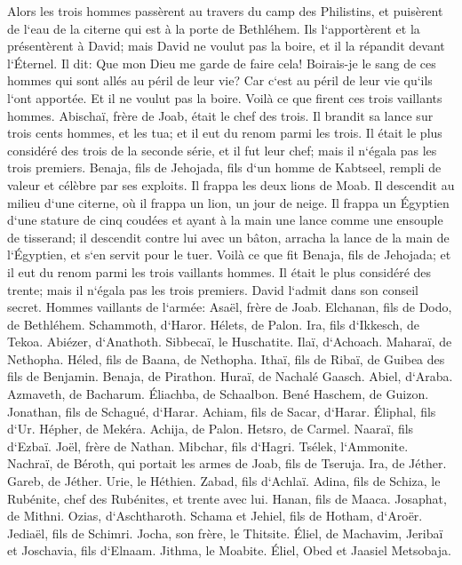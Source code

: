 \verse Alors les trois hommes passèrent au travers du camp des Philistins, et puisèrent de l`eau de la citerne qui est à la porte de Bethléhem. Ils l`apportèrent et la présentèrent à David; mais David ne voulut pas la boire, et il la répandit devant l`Éternel. 
\verse Il dit: Que mon Dieu me garde de faire cela! Boirais-je le sang de ces hommes qui sont allés au péril de leur vie? Car c`est au péril de leur vie qu`ils l`ont apportée. Et il ne voulut pas la boire. Voilà ce que firent ces trois vaillants hommes. 
\verse Abischaï, frère de Joab, était le chef des trois. Il brandit sa lance sur trois cents hommes, et les tua; et il eut du renom parmi les trois. 
\verse Il était le plus considéré des trois de la seconde série, et il fut leur chef; mais il n`égala pas les trois premiers. 
\verse Benaja, fils de Jehojada, fils d`un homme de Kabtseel, rempli de valeur et célèbre par ses exploits. Il frappa les deux lions de Moab. Il descendit au milieu d`une citerne, où il frappa un lion, un jour de neige. 
\verse Il frappa un Égyptien d`une stature de cinq coudées et ayant à la main une lance comme une ensouple de tisserand; il descendit contre lui avec un bâton, arracha la lance de la main de l`Égyptien, et s`en servit pour le tuer. 
\verse Voilà ce que fit Benaja, fils de Jehojada; et il eut du renom parmi les trois vaillants hommes. 
\verse Il était le plus considéré des trente; mais il n`égala pas les trois premiers. David l`admit dans son conseil secret. 
\verse Hommes vaillants de l`armée: Asaël, frère de Joab. Elchanan, fils de Dodo, de Bethléhem. 
\verse Schammoth, d`Haror. Hélets, de Palon. 
\verse Ira, fils d`Ikkesch, de Tekoa. Abiézer, d`Anathoth. 
\verse Sibbecaï, le Huschatite. Ilaï, d`Achoach. 
\verse Maharaï, de Nethopha. Héled, fils de Baana, de Nethopha. 
\verse Ithaï, fils de Ribaï, de Guibea des fils de Benjamin. Benaja, de Pirathon. 
\verse Huraï, de Nachalé Gaasch. Abiel, d`Araba. 
\verse Azmaveth, de Bacharum. Éliachba, de Schaalbon. 
\verse Bené Haschem, de Guizon. Jonathan, fils de Schagué, d`Harar. 
\verse Achiam, fils de Sacar, d`Harar. Éliphal, fils d`Ur. 
\verse Hépher, de Mekéra. Achija, de Palon. 
\verse Hetsro, de Carmel. Naaraï, fils d`Ezbaï. 
\verse Joël, frère de Nathan. Mibchar, fils d`Hagri. 
\verse Tsélek, l`Ammonite. Nachraï, de Béroth, qui portait les armes de Joab, fils de Tseruja. 
\verse Ira, de Jéther. Gareb, de Jéther. 
\verse Urie, le Héthien. Zabad, fils d`Achlaï. 
\verse Adina, fils de Schiza, le Rubénite, chef des Rubénites, et trente avec lui. 
\verse Hanan, fils de Maaca. Josaphat, de Mithni. 
\verse Ozias, d`Aschtharoth. Schama et Jehiel, fils de Hotham, d`Aroër. 
\verse Jediaël, fils de Schimri. Jocha, son frère, le Thitsite. 
\verse Éliel, de Machavim, Jeribaï et Joschavia, fils d`Elnaam. Jithma, le Moabite. 
\verse Éliel, Obed et Jaasiel Metsobaja. 

